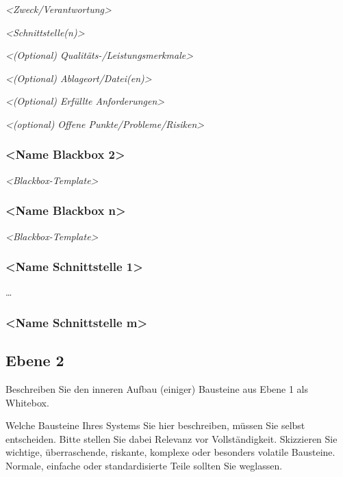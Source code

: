 \documentclass[
]{article}
\begin{document}
\emph{\textless Zweck/Verantwortung\textgreater{}}

\emph{\textless Schnittstelle(n)\textgreater{}}

\emph{\textless(Optional) Qualitäts-/Leistungsmerkmale\textgreater{}}

\emph{\textless(Optional) Ablageort/Datei(en)\textgreater{}}

\emph{\textless(Optional) Erfüllte Anforderungen\textgreater{}}

\emph{\textless(optional) Offene Punkte/Probleme/Risiken\textgreater{}}

\hypertarget{__name_blackbox_2}{%
\subsubsection{\textless Name Blackbox
2\textgreater{}}\label{__name_blackbox_2}}

\emph{\textless Blackbox-Template\textgreater{}}

\hypertarget{__name_blackbox_n}{%
\subsubsection{\textless Name Blackbox
n\textgreater{}}\label{__name_blackbox_n}}

\emph{\textless Blackbox-Template\textgreater{}}

\hypertarget{__name_schnittstelle_1}{%
\subsubsection{\textless Name Schnittstelle
1\textgreater{}}\label{__name_schnittstelle_1}}

\ldots{}

\hypertarget{__name_schnittstelle_m}{%
\subsubsection{\textless Name Schnittstelle
m\textgreater{}}\label{__name_schnittstelle_m}}

\hypertarget{_ebene_2}{%
\subsection{Ebene 2}\label{_ebene_2}}

Beschreiben Sie den inneren Aufbau (einiger) Bausteine aus Ebene 1 als
Whitebox.

Welche Bausteine Ihres Systems Sie hier beschreiben, müssen Sie selbst
entscheiden. Bitte stellen Sie dabei Relevanz vor Vollständigkeit.
Skizzieren Sie wichtige, überraschende, riskante, komplexe oder
besonders volatile Bausteine. Normale, einfache oder standardisierte
Teile sollten Sie weglassen.
\end{document}

